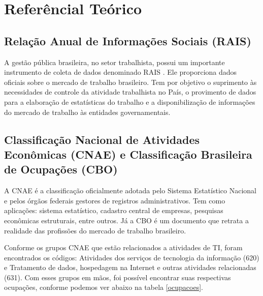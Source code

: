 \section{Referêncial Teórico}
\subsection{Relação Anual de Informações Sociais (RAIS)}

A gestão pública brasileira, no setor trabalhista, possui um importante instrumento de coleta de dados denominado RAIS \cite{Sobre_a_RAIS}. Ele proporciona dados oficiais sobre o mercado de trabalho brasileiro. Tem por objetivo o suprimento às necessidades de controle da atividade trabalhista no País, o provimento de dados para a elaboração de estatísticas do trabalho e a disponibilização de informações do mercado de trabalho às entidades governamentais.

\subsection{Classificação Nacional de Atividades Econômicas (CNAE) e Classificação Brasileira de Ocupações (CBO)}

A CNAE \cite{Sobre_a_CNAE} é a classificação oficialmente adotada pelo Sistema Estatístico Nacional e pelos órgãos federais gestores de registros administrativos. Tem como aplicações: sistema estatístico, cadastro central de empresas, pesquisas econômicas estruturais, entre outros. Já a CBO \cite{Sobre_a_CBO} é um documento que retrata a realidade das profissões do mercado de trabalho brasileiro. 

Conforme os grupos CNAE que estão relacionados a atividades de TI, foram encontrados os códigos: Atividades dos serviços de tecnologia da informação (620) e Tratamento de dados, hospedagem na Internet e outras atividades relacionadas (631). Com esses grupos em mãos, foi possível encontrar suas respectivas ocupações, conforme podemos ver abaixo na tabela \ref{ocupacoes}.


